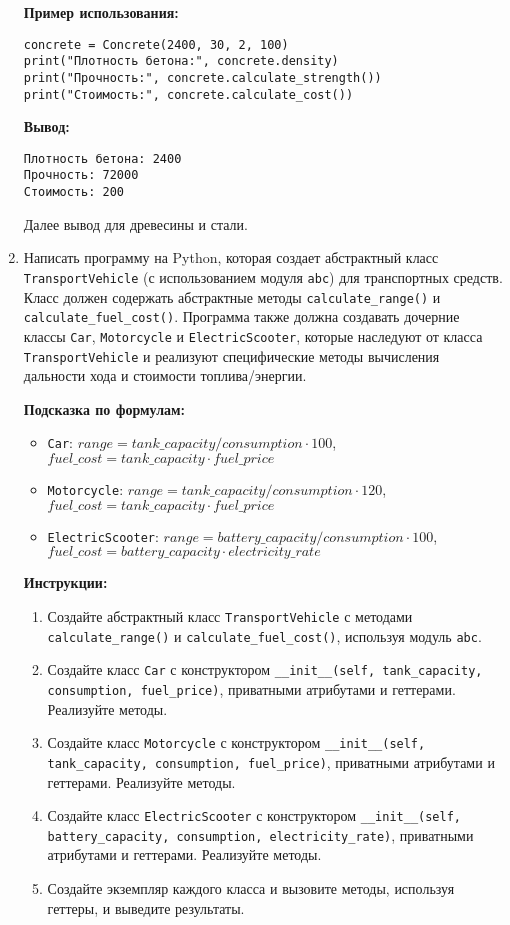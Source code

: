 \begin{enumerate}
\textbf{Пример использования:}
\begin{verbatim}
concrete = Concrete(2400, 30, 2, 100)
print("Плотность бетона:", concrete.density)
print("Прочность:", concrete.calculate_strength())
print("Стоимость:", concrete.calculate_cost())
\end{verbatim}

\textbf{Вывод:}
\begin{verbatim}
Плотность бетона: 2400
Прочность: 72000
Стоимость: 200
\end{verbatim}

Далее вывод для древесины и стали.

\item
Написать программу на Python, которая создает абстрактный класс \texttt{TransportVehicle} (с использованием модуля \texttt{abc}) для транспортных средств. 
Класс должен содержать абстрактные методы \texttt{calculate\_range()} и \texttt{calculate\_fuel\_cost()}. 
Программа также должна создавать дочерние классы \texttt{Car}, \texttt{Motorcycle} и \texttt{ElectricScooter}, 
которые наследуют от класса \texttt{TransportVehicle} и реализуют специфические методы вычисления дальности хода и стоимости топлива/энергии.

\textbf{Подсказка по формулам:}
\begin{itemize}
    \item \texttt{Car}: $range = tank\_capacity / consumption \cdot 100$, $fuel\_cost = tank\_capacity \cdot fuel\_price$
    \item \texttt{Motorcycle}: $range = tank\_capacity / consumption \cdot 120$, $fuel\_cost = tank\_capacity \cdot fuel\_price$
    \item \texttt{ElectricScooter}: $range = battery\_capacity / consumption \cdot 100$, $fuel\_cost = battery\_capacity \cdot electricity\_rate$
\end{itemize}

\textbf{Инструкции:}
\begin{enumerate}
    \item Создайте абстрактный класс \texttt{TransportVehicle} с методами \texttt{calculate\_range()} и \texttt{calculate\_fuel\_cost()}, используя модуль \texttt{abc}.
    \item Создайте класс \texttt{Car} с конструктором \texttt{\_\_init\_\_(self, tank\_capacity, consumption, fuel\_price)}, приватными атрибутами и геттерами. Реализуйте методы.
    \item Создайте класс \texttt{Motorcycle} с конструктором \texttt{\_\_init\_\_(self, tank\_capacity, consumption, fuel\_price)}, приватными атрибутами и геттерами. Реализуйте методы.
    \item Создайте класс \texttt{ElectricScooter} с конструктором \texttt{\_\_init\_\_(self, battery\_capacity, consumption, electricity\_rate)}, приватными атрибутами и геттерами. Реализуйте методы.
    \item Создайте экземпляр каждого класса и вызовите методы, используя геттеры, и выведите результаты.
\end{enumerate}


\end{enumerate}
